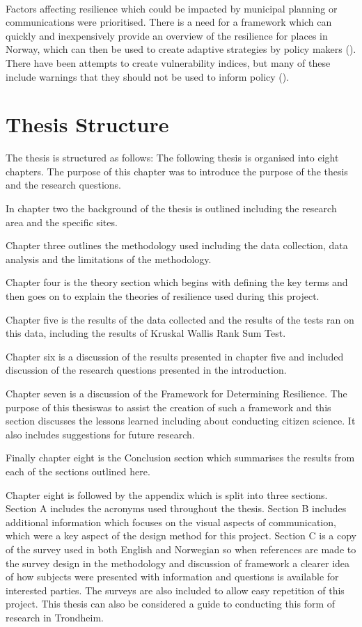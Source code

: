 \paragraph{}
Factors affecting resilience which could be impacted by municipal planning or communications were prioritised. There is a need for a framework which can quickly and inexpensively provide an overview of the resilience for places in Norway, which can then be used to create adaptive strategies by policy makers (\cite{opach_seeking_2020}). There have been attempts to create vulnerability indices, but many of these include warnings that they should not be used to inform policy (\cite{opach_seeking_2020}).


\section{Thesis Structure}
The thesis is structured as follows: 
The following thesis is organised into eight chapters. The purpose of this chapter was to introduce the purpose of the thesis and the research questions.

In chapter two the background of the thesis is outlined including the research area and the specific sites. 

Chapter three outlines the methodology used including the data collection, data analysis and the limitations of the methodology.

Chapter four is the theory section which begins with defining the key terms and then goes on to explain the theories of resilience used during this project.

Chapter five is the results of the data collected and the results of the tests ran on this data, including the results of Kruskal Wallis Rank Sum Test. 

Chapter six is a discussion of the results presented in chapter five and included discussion of the research questions presented in the introduction. 

Chapter seven is a discussion of the Framework for Determining Resilience. The purpose of this thesiswas to assist the creation of such a framework and this section discusses the lessons learned including about conducting citizen science. It also includes suggestions for future research.

Finally chapter eight is the Conclusion section which summarises the results from each of the sections outlined here.

Chapter eight is followed by the appendix which is split into three sections. Section A includes the acronyms used throughout the thesis. Section B includes additional information which focuses on the visual aspects of communication, which were a key aspect of the design method for this project. Section C is a copy of the survey used in both English and Norwegian so when references are made to the survey design in the methodology and  discussion of framework a clearer idea of how subjects were presented with information and questions is available for interested parties. The surveys are also included to allow easy repetition of this project. This thesis can also be considered a guide to conducting this form of research in Trondheim. 
